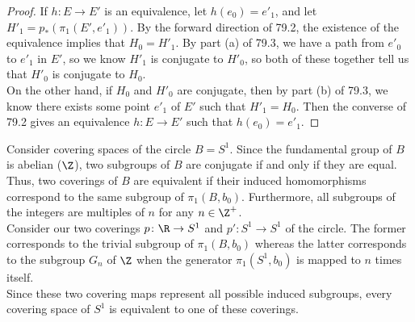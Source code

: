 \begin{proof}
If $h \colon E \rightarrow E'$ is an equivalence, let $h(e_0) = e'_1$, and let $H'_1 = p_*(\pi_1(E', e'_1))$. By the forward direction of 79.2, the existence of the equivalence implies that $H_0 = H'_1$. By part (a) of 79.3, we have a path from $e'_0$ to $e'_1$ in $E'$, so we know $H'_1$ is conjugate to $H'_0$, so both of these together tell us that $H'_0$ is conjugate to $H_0$. \\

On the other hand, if $H_0$ and $H'_0$ are conjugate, then by part (b) of 79.3, we know there exists some point $e'_1$ of $E'$ such that $H'_1 = H_0$. Then the converse of 79.2 gives an equivalence $h \colon E \rightarrow E'$ such that $h(e_0) = e'_1$.
\end{proof}

\begin{eg}
Consider covering spaces of the circle $B = S^1$. Since the fundamental group of $B$ is abelian ($\Z$), two subgroups of $B$ are conjugate if and only if they are equal. Thus, two coverings of $B$ are equivalent if their induced homomorphisms correspond to the same subgroup of $\pi_1(B, b_0)$. Furthermore, all subgroups of the integers are multiples of $n$ for any $n \in \Z^+$. \\

Consider our two coverings $p \colon \R \rightarrow S^1$ and $p': S^1 \rightarrow S^1$ of the circle. The former corresponds to the trivial subgroup of $\pi_1(B, b_0)$ whereas the latter corresponds to the subgroup $G_n$ of $\Z$ when the generator $\pi_1(S^1, b_0)$ is mapped to $n$ times itself. \\

Since these two covering maps represent all possible induced subgroups, every covering space of $S^1$ is equivalent to one of these coverings. 
\end{eg}



